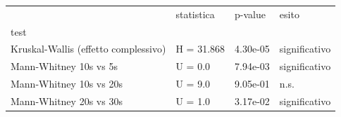 \begin{tabular}{llll}
\toprule
 & statistica & p-value & esito \\
test &  &  &  \\
\midrule
Kruskal-Wallis (effetto complessivo) & H = 31.868 & 4.30e-05 & significativo \\
Mann-Whitney 10s vs 5s & U = 0.0 & 7.94e-03 & significativo \\
Mann-Whitney 10s vs 20s & U = 9.0 & 9.05e-01 & n.s. \\
Mann-Whitney 20s vs 30s & U = 1.0 & 3.17e-02 & significativo \\
\bottomrule
\end{tabular}
